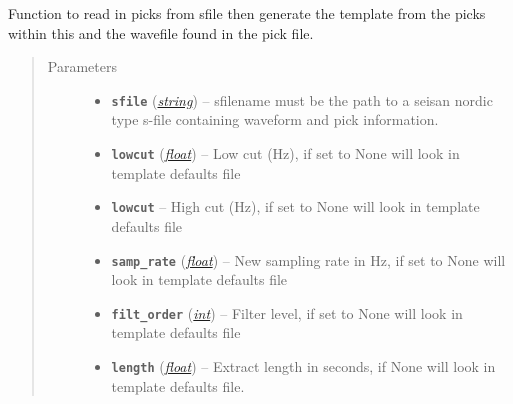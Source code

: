\documentclass[a4paper,10pt,english]{sphinxmanual}
\begin{document}

\begin{fulllineitems}
\label{core:template_gen.from_sfile}
Function to read in picks from sfile then generate the template from the
picks within this and the wavefile found in the pick file.
\begin{quote}\begin{description}
\item[{Parameters}] \leavevmode\begin{itemize}
\item {} 
\textbf{\texttt{sfile}} (\href{https://docs.python.org/library/string.html\#module-string}{\emph{string}}) -- sfilename must be the    path to a seisan nordic type s-file containing waveform and pick    information.

\item {} 
\textbf{\texttt{lowcut}} (\href{https://docs.python.org/library/functions.html\#float}{\emph{float}}) -- Low cut (Hz), if set to None will look in template            defaults file

\item {} 
\textbf{\texttt{lowcut}} -- High cut (Hz), if set to None will look in template            defaults file

\item {} 
\textbf{\texttt{samp\_rate}} (\href{https://docs.python.org/library/functions.html\#float}{\emph{float}}) -- New sampling rate in Hz, if set to None will look in            template defaults file

\item {} 
\textbf{\texttt{filt\_order}} (\href{https://docs.python.org/library/functions.html\#int}{\emph{int}}) -- Filter level, if set to None will look in            template defaults file

\item {} 
\textbf{\texttt{length}} (\href{https://docs.python.org/library/functions.html\#float}{\emph{float}}) -- Extract length in seconds, if None will look in template            defaults file.

\end{itemize}

\end{description}\end{quote}

\end{fulllineitems}
\end{document}
